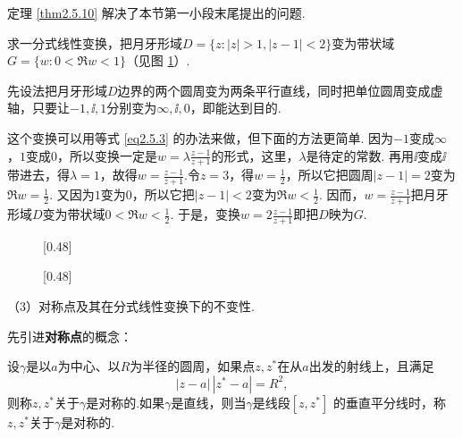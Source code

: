 定理 \ref{thm2.5.10} 解决了本节第一小段末尾提出的问题.
\begin{example}\label{exam2.5.11}
求一分式线性变换，把月牙形域$D=\{z:|z|>1,|z-1|<2\}$变为带状域$G=\{w:0<\Re w<1\}$（见图 \ref{fig2.12}）.
\end{example}
\begin{solution}
先设法把月牙形域$D$边界的两个圆周变为两条平行直线，同时把单位圆周变成虚轴，只要让$-1,\ii,1$分别变为$\infty,\ii,0$，即能达到目的.

这个变换可以用等式 \ref{eq2.5.3} 的办法来做，但下面的方法更简单. 因为$-1$变成$\infty$，$1$变成$0$，所以变换一定是$w=\lambda\frac{z-1}{z+1}$的形式，这里，$\lambda$是待定的常数. 再用$\ii$变成$\ii$带进去，得$\lambda=1$，故得$w=\frac{z-1}{z+1}$.令$z=3$，得$w=\frac12$，所以它把圆周$|z-1|=2$变为$\Re w=\frac12$. 又因为$1$变为$0$，所以它把$|z-1|<2$变为$\Re w<\frac12$. 因而，$w=\frac{z-1}{z+1}$把月牙形域$D$变为带状域$0<\Re w<\frac12$. 于是，变换$w=2\frac{z-1}{z+1}$即把$D$映为$G$.
\end{solution}
\begin{figure}[!ht]
\centering
\subcaptionbox{\label{fig2.12a}}[0.48\textwidth]
{
}
\subcaptionbox{\label{fig2.12b}}[0.48\textwidth]
{
}
\caption{\label{fig2.12}}
\end{figure}


（3）{\kaishu 对称点及其在分式线性变换下的不变性.}

先引进\textbf{对称点}的概念：
\begin{definition}\label{def2.5.12}
设$\gamma$是以$a$为中心、以$R$为半径的圆周，如果点$z,z^\ast$在从$a$出发的射线上，且满足
\begin{equation}\label{eq2.5.7}
|z-a|\,|z^\ast-a|=R^2,
\end{equation}
则称$z,z^\ast$关于$\gamma$是对称的.如果$\gamma$是直线，则当$\gamma$是线段$[z,z^\ast]$
的垂直平分线时，称$z,z^\ast$关于$\gamma$是对称的.
\end{definition}

